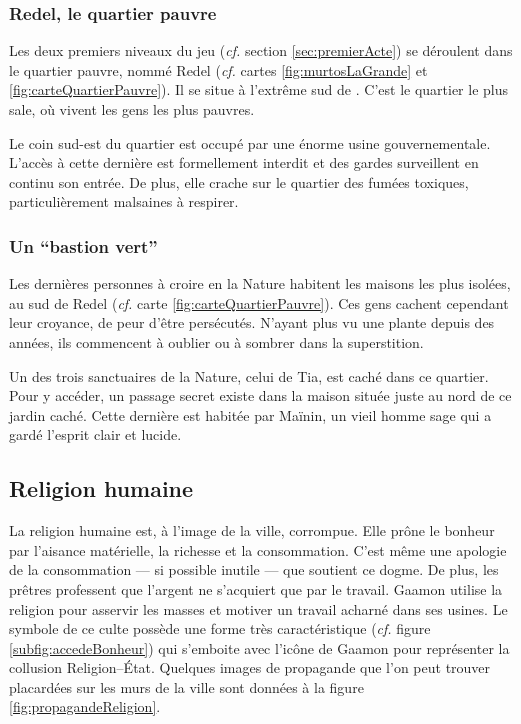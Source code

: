 \subsubsection{Redel, le quartier pauvre}
Les deux premiers niveaux du jeu (\textit{cf.} section \ref{sec:premierActe}) se déroulent dans le quartier pauvre, nommé Redel (\textit{cf.} cartes \ref{fig:murtosLaGrande} et \ref{fig:carteQuartierPauvre}). Il se situe à l'extrême sud de \nomVille. C'est le quartier le plus sale, où vivent les gens les plus pauvres.

Le coin sud-est du quartier est occupé par une énorme usine gouvernementale. L'accès à cette dernière est formellement interdit et des gardes surveillent en continu son entrée. De plus, elle crache sur le quartier des fumées toxiques, particulièrement malsaines à respirer.

\subsubsection{Un \enquote{bastion vert}}
Les dernières personnes à croire en la Nature habitent les maisons les plus isolées, au sud de Redel (\textit{cf.} carte \ref{fig:carteQuartierPauvre}). Ces gens cachent cependant leur croyance, de peur d'être persécutés. N'ayant plus vu une plante depuis des années, ils commencent à oublier ou à sombrer dans la superstition.

Un des trois sanctuaires de la Nature, celui de Tia, est caché dans ce quartier. Pour y accéder, un passage secret existe dans la maison située juste au nord de ce jardin caché. Cette dernière est habitée par Maïnin, un vieil homme sage qui a gardé l'esprit clair et lucide.


\subsection{Religion humaine}
La religion humaine est, à l'image de la ville, corrompue. Elle prône le bonheur par l'aisance matérielle, la richesse et la consommation. C'est même une apologie de la consommation --- si possible inutile --- que soutient ce dogme. De plus, les prêtres professent que l'argent ne s'acquiert que par le travail. Gaamon utilise la religion pour asservir les masses et motiver un travail acharné dans ses usines. Le symbole de ce culte possède une forme très caractéristique (\textit{cf.} figure \ref{subfig:accedeBonheur}) qui s'emboite avec l'icône de Gaamon pour représenter la collusion Religion--État. Quelques images de propagande que l'on peut trouver placardées sur les murs de la ville sont données à la figure \ref{fig:propagandeReligion}.

